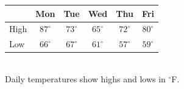 \documentclass[border=6pt]{standalone}
\begin{document}
\begin{minipage}{11cm}
\centering
\begin{tabular}{@{} l c c c c c @{}}
\toprule
 & Mon & Tue & Wed & Thu & Fri \\
\midrule
High & $87^\circ$ & $73^\circ$ & $65^\circ$ & $72^\circ$ & $80^\circ$ \\
Low  & $66^\circ$ & $67^\circ$ & $61^\circ$ & $57^\circ$ & $59^\circ$ \\
\bottomrule
\end{tabular}\\[0.8em]
\small Daily temperatures show highs and lows in $^\circ$F.
\end{minipage}
\end{document}
